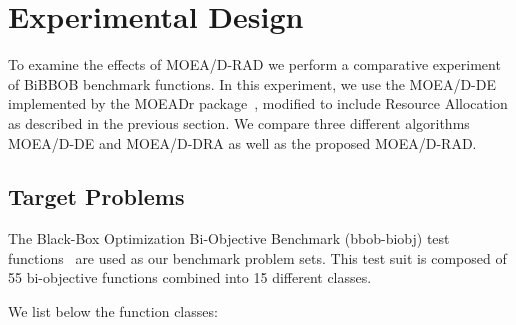 \section{Experimental Design}

%

To examine the effects of MOEA/D-RAD we perform a comparative experiment of BiBBOB benchmark functions. In this experiment, we use the MOEA/D-DE implemented by the MOEADr package~\cite{moeadr_package}, modified to include Resource Allocation as described in the previous section. We compare three different algorithms MOEA/D-DE and MOEA/D-DRA as well as the proposed MOEA/D-RAD.

\subsection{Target Problems}\label{target_problems}

The Black-Box Optimization Bi-Objective Benchmark (bbob-biobj) test functions~\cite{tusar2016coco} are used as our benchmark problem sets. This test suit is composed of 55 bi-objective functions combined into 15 different classes.

We list below the function classes:

